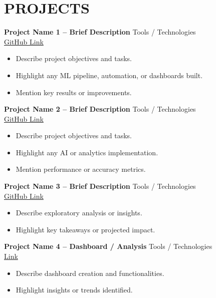 \documentclass[a4paper,10pt]{article}
\begin{document}
\section*{PROJECTS}

\textbf{Project Name 1 – Brief Description} \hfill Tools / Technologies\\
\href{https://github.com/placeholder}{GitHub Link}
\begin{itemize}[nosep]
    \item Describe project objectives and tasks.
    \item Highlight any ML pipeline, automation, or dashboards built.
    \item Mention key results or improvements.
\end{itemize}
\vspace{1\baselineskip}

\textbf{Project Name 2 – Brief Description} \hfill Tools / Technologies\\
\href{https://github.com/placeholder}{GitHub Link}
\begin{itemize}[nosep]
    \item Describe project objectives and tasks.
    \item Highlight any AI or analytics implementation.
    \item Mention performance or accuracy metrics.
\end{itemize}
\vspace{1\baselineskip}

\textbf{Project Name 3 – Brief Description} \hfill Tools / Technologies\\
\href{https://github.com/placeholder}{GitHub Link}
\begin{itemize}[nosep]
    \item Describe exploratory analysis or insights.
    \item Highlight key takeaways or projected impact.
\end{itemize}
\vspace{1\baselineskip}

\newpage %

\textbf{Project Name 4 – Dashboard / Analysis} \hfill Tools / Technologies\\
\href{https://placeholder.com}{Link}
\begin{itemize}[nosep]
    \item Describe dashboard creation and functionalities.
    \item Highlight insights or trends identified.
\end{itemize}
\vspace{1\baselineskip}
\end{document}
